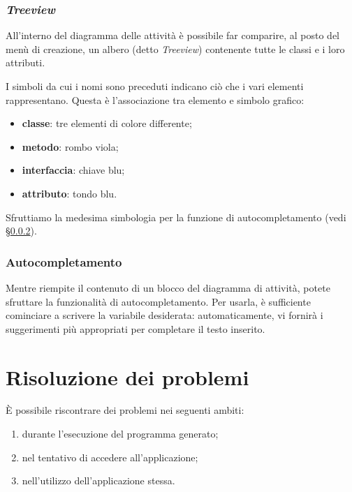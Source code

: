 \subsubsection{\emph{Treeview}}
All'interno del diagramma delle attività è possibile far comparire, al posto del menù di creazione, un albero (detto \emph{Treeview}) contenente tutte le classi e i loro attributi.

I simboli da cui i nomi sono preceduti indicano ciò che i vari elementi rappresentano. Questa è l'associazione tra elemento e simbolo grafico:
\begin{itemize}
	\item \textbf{classe}: tre elementi di colore differente;
	\item \textbf{metodo}: rombo viola;
	\item \textbf{interfaccia}: chiave blu;
	\item \textbf{attributo}: tondo blu.
\end{itemize}

Sfruttiamo la medesima simbologia per la funzione di autocompletamento (vedi §\ref{sec:autocomplete}).

\subsubsection{Autocompletamento} \label{sec:autocomplete}
Mentre riempite il contenuto di un blocco del diagramma di attività, potete sfruttare la funzionalità di autocompletamento. Per usarla, è sufficiente cominciare a scrivere la variabile desiderata: automaticamente, \proj{} vi fornirà i suggerimenti più appropriati per completare il testo inserito.




\section{Risoluzione dei problemi} \label{sec:problemi}

È possibile riscontrare dei problemi nei seguenti ambiti:
\begin{enumerate}
	\item durante l'esecuzione del programma generato;
	\item nel tentativo di accedere all'applicazione;
	\item nell'utilizzo dell'applicazione stessa.
\end{enumerate}



